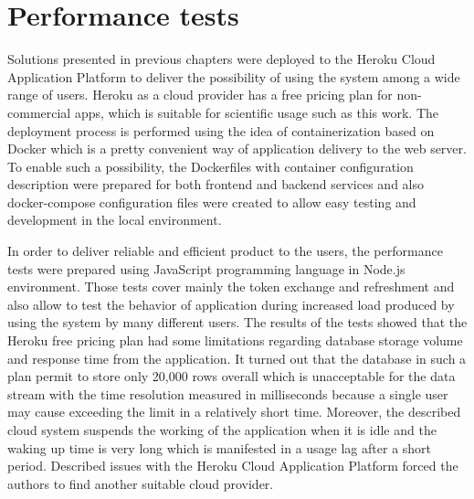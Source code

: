 \section{Performance tests}\label{sec:performance-tests}
Solutions presented in previous chapters were deployed to the Heroku Cloud Application Platform to deliver the possibility of using the system among a wide range of users.
Heroku as a cloud provider has a free pricing plan for non-commercial apps, which is suitable for scientific usage such as this work.
The deployment process is performed using the idea of containerization based on Docker which is a pretty convenient way of application delivery to the web server.
To enable such a possibility, the \mbox{Dockerfiles} with container configuration description were prepared for both frontend and backend services and also docker-compose configuration files were created to allow easy testing and development in the local environment.

In order to deliver reliable and efficient product to the users, the performance tests were prepared using JavaScript programming language in Node.js environment.
Those tests cover mainly the token exchange and refreshment and also allow to test the behavior of application during increased load produced by using the system by many different users.
The results of the tests showed that the Heroku free pricing plan had some limitations regarding database storage volume and response time from the application.
It turned out that the database in such a plan permit to store only 20,000 rows overall which is unacceptable for the data stream with the time resolution measured in milliseconds because a single user may cause exceeding the limit in a relatively short time.
Moreover, the described cloud system suspends the working of the application when it is idle and the waking up time is very long which is manifested in a usage lag after a short period.
Described issues with the Heroku Cloud Application Platform forced the authors to find another suitable cloud provider.
